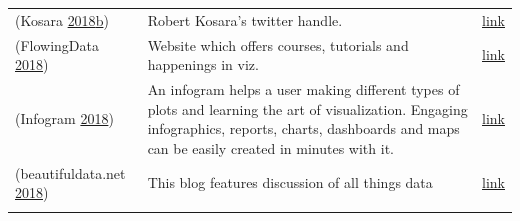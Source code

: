 \documentclass[]{book}
\begin{document}
\begin{longtable}[]{@{}lll@{}}
\begin{minipage}[t]{0.15\columnwidth}
(Kosara \protect\hyperlink{ref-twitter_Kosara}{2018}\protect\hyperlink{ref-twitter_Kosara}{b})\strut
\end{minipage} & \begin{minipage}[t]{0.28\columnwidth}\raggedright
Robert Kosara's twitter handle.\strut
\end{minipage} & \begin{minipage}[t]{0.48\columnwidth}\raggedright
\href{https://twitter.com/eagereyes?lang=en}{link}\strut
\end{minipage}\tabularnewline
\begin{minipage}[t]{0.15\columnwidth}\raggedright
(FlowingData \protect\hyperlink{ref-flowingdata}{2018})\strut
\end{minipage} & \begin{minipage}[t]{0.28\columnwidth}\raggedright
Website which offers courses, tutorials and happenings in viz.\strut
\end{minipage} & \begin{minipage}[t]{0.48\columnwidth}\raggedright
\href{http://flowingdata.com/}{link}\strut
\end{minipage}\tabularnewline
\begin{minipage}[t]{0.15\columnwidth}\raggedright
(Infogram \protect\hyperlink{ref-infogram}{2018})\strut
\end{minipage} & \begin{minipage}[t]{0.28\columnwidth}\raggedright
An infogram helps a user making different types of plots and learning the art of visualization. Engaging infographics, reports, charts, dashboards and maps can be easily created in minutes with it.\strut
\end{minipage} & \begin{minipage}[t]{0.48\columnwidth}\raggedright
\href{https://infogram.com/}{link}\strut
\end{minipage}\tabularnewline
\begin{minipage}[t]{0.15\columnwidth}\raggedright
(beautifuldata.net \protect\hyperlink{ref-data_beaut}{2018})\strut
\end{minipage} & \begin{minipage}[t]{0.28\columnwidth}\raggedright
This blog features discussion of all things data\strut
\end{minipage} & \begin{minipage}[t]{0.48\columnwidth}\raggedright
\href{http://beautifuldata.net}{link}\strut
\end{minipage}\tabularnewline
\begin{minipage}[t]{0.15\columnwidth}\raggedright

\end{minipage}
\end{longtable}
\end{document}
